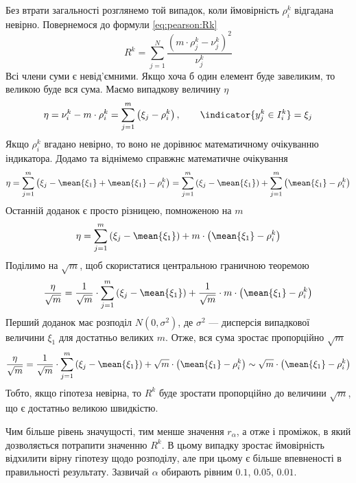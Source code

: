 Без втрати загальності розглянемо той випадок, коли ймовірність $\rho_i^k$
відгадана невірно. Повернемося до формули \eqref{eq:pearson:Rk}
\begin{equation*}
  R^k
  = \sum_{j=1}^{N}\frac{\left( m \cdot \rho_j^k - \nu_j^k \right)^2}{\nu_j^k}
\end{equation*}
Всі члени суми є невід’ємними. Якщо хоча б один елемент буде завеликим,
то великою буде вся сума. Маємо випадкову величину $\eta$
\begin{equation*}
  \eta
  = \nu_i^k - m \cdot \rho_i^k
  = \sum_{j=1}^{m} \left( \xi_j - \rho_i^k \right),
  \qquad \indicator{y_j^k \in I_i^k} = \xi_j
\end{equation*}
Якщо $\rho_i^k$ вгадано невірно, то воно не дорівнює математичному очікуванню
індикатора. Додамо та віднімемо справжнє математичне очікування
\begin{equation*}
  \eta
  = \sum_{j=1}^{m} \left( \xi_j - \mean{\xi_1} + \mean{\xi_1} - \rho_i^k \right)
  = \sum_{j=1}^{m} \left( \xi_j - \mean{\xi_1} \right)
    + \sum_{j=1}^{m} \left( \mean{\xi_1} - \rho_i^k \right)
\end{equation*}
Останній доданок є просто різницею, помноженою на $m$
\begin{equation*}
  \eta
  = \sum_{j=1}^{m} \left( \xi_j - \mean{\xi_1} \right)
    + m \cdot \left( \mean{\xi_1} - \rho_i^k \right)
\end{equation*}
Поділимо на $\sqrt{m}$, щоб скористатися центральною граничною теоремою
\begin{equation*}
  \frac{\eta}{\sqrt{m}}
  = \frac{1}{\sqrt{m}} \cdot \sum_{j=1}^{m} \left( \xi_j - \mean{\xi_1} \right)
    + \frac{1}{\sqrt{m}} \cdot m \cdot \left( \mean{\xi_1} - \rho_i^k \right)
\end{equation*}
Перший доданок має розподіл $N\left( 0, \sigma^2 \right)$, де $\sigma^2$ ---
дисперсія випадкової величини $\xi_1$ для достатньо великих $m$.
Отже, вся сума зростає пропорційно
$\sqrt{m}$
\begin{equation*}
  \frac{\eta}{\sqrt{m}}
  = \frac{1}{\sqrt{m}} \cdot \sum_{j=1}^{m} \left( \xi_j - \mean{\xi_1} \right)
    + \sqrt{m} \cdot \left( \mean{\xi_1} - \rho_i^k \right)
  \sim \sqrt{m} \cdot \left( \mean{\xi_1} - \rho_i^k \right)
\end{equation*}
Тобто, якщо гіпотеза невірна, то $R^k$ буде зростати пропорційно до величини
$\sqrt{m}$, що є достатньо великою швидкістю.

Чим більше рівень значущості, тим менше значення $r_{\alpha}$, а отже і
проміжок, в який дозволяється потрапити значенню $R^k$.
В цьому випадку зростає ймовірність відхилити вірну гіпотезу щодо розподілу,
але при цьому є більше впевненості в правильності результату.
Зазвичай $\alpha$ обирають рівним $0.1$, $0.05$, $0.01$.
